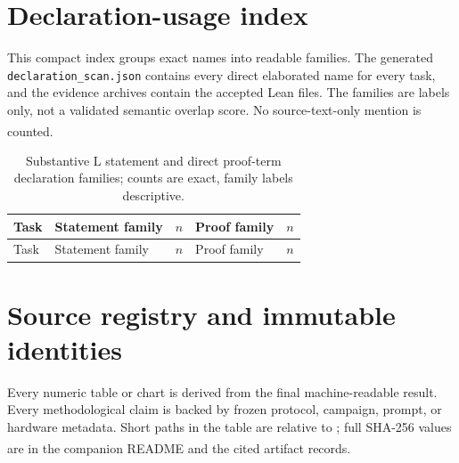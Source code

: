 \documentclass[10pt,a4paper]{article}
\newcommand{\src}[1]{\textsuperscript{\cite{#1}}}
\begin{document}
\section{Declaration-usage index}

This compact index groups exact names into readable families. The generated
\texttt{declaration\_scan.json} contains every direct elaborated name for
every task, and the evidence archives contain the accepted Lean files. The
families are labels only, not a validated semantic overlap score. No
source-text-only mention is counted.\src{declscan,results35,evidencearchives}

\small
\begin{longtable}{@{}p{}p{}rp{}r@{}}
\caption{Substantive L statement and direct proof-term declaration families; counts are exact, family labels descriptive.\cite{declscan,results35}}\\
\toprule Task & Statement family & $n$ & Proof family & $n$\\\midrule\endfirsthead
\toprule Task & Statement family & $n$ & Proof family & $n$\\\midrule\endhead

\end{longtable}
\normalsize

\section{Source registry and immutable identities}

Every numeric table or chart is derived from the final machine-readable
result. Every methodological claim is backed by frozen protocol, campaign,
prompt, or hardware metadata. Short paths in the table are relative to
; full SHA-256 values are in the companion README and the cited
artifact records.\src{readme}
\end{document}
